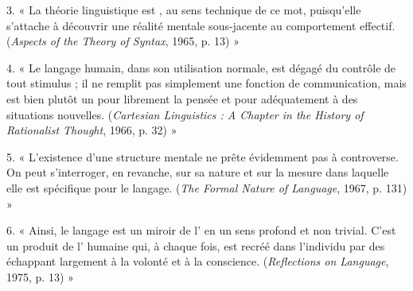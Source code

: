 3. « La théorie linguistique est \underline{\hspace{2.5cm}}, au sens technique de ce mot, puisqu’elle s’attache à découvrir une réalité mentale sous-jacente au comportement effectif. (\emph{Aspects of the Theory of Syntax}, 1965, p. 13) »

4. « Le langage humain, dans son utilisation normale, est dégagé du contrôle de tout stimulus ; il ne remplit pas simplement une fonction de communication, mais est bien plutôt un \underline{\hspace{2.2cm}} pour \underline{\hspace{2.2cm}} librement la pensée et pour \underline{\hspace{2.2cm}} adéquatement à des situations nouvelles. (\emph{Cartesian Linguistics : A Chapter in the History of Rationalist Thought}, 1966, p. 32) »

5. « L’existence d’une structure mentale \underline{\hspace{2.5cm}} ne prête évidemment pas à controverse. On peut s’interroger, en revanche, sur sa nature et sur la mesure dans laquelle elle est spécifique pour le langage. (\emph{The Formal Nature of Language}, 1967, p. 131) »

6. « Ainsi, le langage est un miroir de l’\underline{\hspace{2.2cm}} en un sens profond et non trivial. C’est un produit de l’\underline{\hspace{2.2cm}} humaine qui, à chaque fois, est recréé dans l’individu par des \underline{\hspace{2.2cm}} échappant largement à la volonté et à la conscience. (\emph{Reflections on Language}, 1975, p. 13) »

